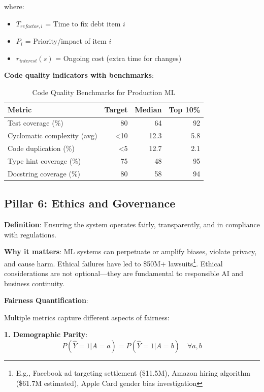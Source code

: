 where:
\begin{itemize}
    \item $T_{refactor,i}$ = Time to fix debt item $i$
    \item $P_i$ = Priority/impact of item $i$
    \item $r_{interest}(s)$ = Ongoing cost (extra time for changes)
\end{itemize}

\textbf{Code quality indicators with benchmarks}:

\begin{table}[h]
\centering
\caption{Code Quality Benchmarks for Production ML}
\begin{tabular}{lrrr}
\toprule
\textbf{Metric} & \textbf{Target} & \textbf{Median} & \textbf{Top 10\%} \\
\midrule
Test coverage (\%) & 80 & 64 & 92 \\
Cyclomatic complexity (avg) & <10 & 12.3 & 5.8 \\
Code duplication (\%) & <5 & 12.7 & 2.1 \\
Type hint coverage (\%) & 75 & 48 & 95 \\
Docstring coverage (\%) & 80 & 58 & 94 \\
\bottomrule
\end{tabular}
\end{table}

\subsection{Pillar 6: Ethics and Governance}

\textbf{Definition}: Ensuring the system operates fairly, transparently, and in compliance with regulations.

\textbf{Why it matters}: ML systems can perpetuate or amplify biases, violate privacy, and cause harm. Ethical failures have led to \$50M+ lawsuits\footnote{E.g., Facebook ad targeting settlement (\$11.5M), Amazon hiring algorithm (\$61.7M estimated), Apple Card gender bias investigation}. Ethical considerations are not optional---they are fundamental to responsible AI and business continuity.

\textbf{Fairness Quantification}:

Multiple metrics capture different aspects of fairness:

\textbf{1. Demographic Parity}:
\begin{equation}
P(\hat{Y} = 1 | A = a) = P(\hat{Y} = 1 | A = b) \quad \forall a, b
\end{equation}

